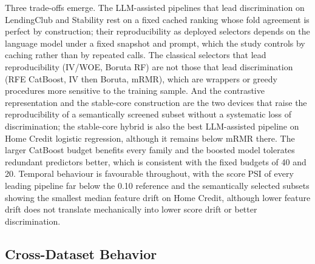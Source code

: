 \documentclass[final,5p,twocolumn]{elsarticle}
\begin{document}
Three trade-offs emerge. The LLM-assisted pipelines that lead discrimination on LendingClub and Stability rest on a fixed cached ranking whose fold agreement is perfect by construction; their reproducibility as deployed selectors depends on the language model under a fixed snapshot and prompt, which the study controls by caching rather than by repeated calls. The classical selectors that lead reproducibility (IV/WOE, Boruta RF) are not those that lead discrimination (RFE CatBoost, IV then Boruta, mRMR), which are wrappers or greedy procedures more sensitive to the training sample. And the contrastive representation and the stable-core construction are the two devices that raise the reproducibility of a semantically screened subset without a systematic loss of discrimination; the stable-core hybrid is also the best LLM-assisted pipeline on Home Credit logistic regression, although it remains below mRMR there. The larger CatBoost budget benefits every family and the boosted model tolerates redundant predictors better, which is consistent with the fixed budgets of 40 and 20. Temporal behaviour is favourable throughout, with the score PSI of every leading pipeline far below the 0.10 reference and the semantically selected subsets showing the smallest median feature drift on Home Credit, although lower feature drift does not translate mechanically into lower score drift or better discrimination.

\subsection{Cross-Dataset Behavior}
\label{subsec:cross_dataset}
\end{document}
